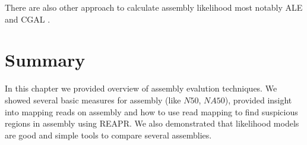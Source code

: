 There are also other approach to calculate assembly likelihood
most notably ALE and CGAL \citep{ALE, CGAL}.

\section{Summary}

In this chapter we provided overview of assembly evalution techniques.
We showed several basic measures for assembly (like $N50$, $NA50$),
provided insight into mapping reads on assembly and how to use
read mapping to find suspicious regions in assembly using REAPR.
We also demonstrated that likelihood models are good and simple
tools to compare several assemblies.

